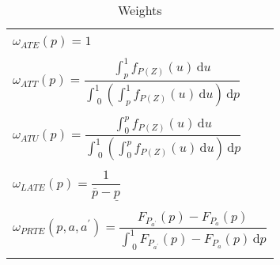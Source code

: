 \documentclass[11pt,reqno]{amsart}
\theoremstyle{plain}
\numberwithin{equation}{section}
\begin{document}
	\begin{table}[!htb]
		\centering
		\caption{{Weights}} \label{weights}
		\begin{tabular}{l}
			\hline
			\hline

			\\

			$\omega_{ATE}\left(p\right) = 1$ \\

			\\

			$\omega_{ATT}\left(p\right) = \dfrac{\int_{p}^{1} f_{P\left(Z\right)}\left(u\right) \, \text{d} u}{\int_{\hspace{3pt} 0}^{1} \left(\int_{p}^{1} f_{P\left(Z\right)}\left(u\right) \, \text{d} u \right)\, \text{d} p}$ \\

			\\

			$\omega_{ATU}\left(p\right) = \dfrac{\int_{0}^{p} f_{P\left(Z\right)}\left(u\right) \, \text{d} u}{\int_{\hspace{3pt} 0}^{1} \left( \int_{0}^{p} f_{P\left(Z\right)}\left(u\right) \, \text{d} u \right)\, \text{d} p}$ \\

			\\

			$\omega_{LATE}\left(p\right) = \dfrac{1}{\overline{p} - \underline{p}}$ \\

			\\

			$\omega_{PRTE}\left(p, a, a^{\prime}\right) = \dfrac{F_{P_{a^{\prime}}}\left(p\right) - F_{P_{a}}\left(p\right)}{\int_{\hspace{3pt} 0}^{1}  F_{P_{a^{\prime}}}\left(p\right) - F_{P_{a}}\left(p\right)\, \text{d} p}$ \\

			\\

			\hline
		\end{tabular}
	\end{table}
\end{document}
